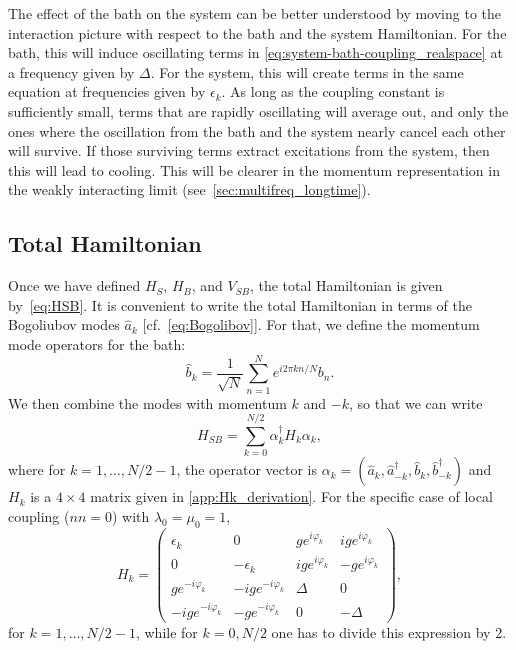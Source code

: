 \documentclass[aps,prx,twocolumn,superscriptaddress,nofootinbib,nolongbibliography,nobalancelastpage,10pt,floatfix]{revtex4-2}
\begin{document}
The effect of the bath on the system can be better understood by moving to the interaction picture with respect to the bath and the system Hamiltonian. For the bath, this will induce oscillating terms in \cref{eq:system-bath-coupling_realspace}
at a frequency given by $\Delta$. For the system, this will create terms in the same equation at frequencies given by $\epsilon_k$. As long as the coupling constant is sufficiently small, terms that are rapidly oscillating will average out, and only the ones where the oscillation from the bath and the system nearly cancel each other will survive. If those surviving terms extract excitations from the system, then this will lead to cooling. This will be clearer in the momentum representation in the weakly interacting limit (see~\cref{sec:multifreq_longtime}).

\subsection{Total Hamiltonian}
\label{subsec:total_hamiltonian}

Once we have defined $H_S$, $H_B$, and $V_{SB}$, the total Hamiltonian is given by~\cref{eq:HSB}. It is convenient to write the total Hamiltonian in terms of the Bogoliubov modes $\hat{a}_k$ [cf.~\cref{eq:Bogolibov}]. For that, we define the momentum mode operators for the bath:
\begin{equation}
    \hat b_k = \frac{1}{\sqrt{N}}\sum_{n=1}^N e^{i 2\pi k n/N} b_n.
\end{equation}
We then combine the modes with momentum $k$ and $-k$, so that we can write
\begin{equation}
    H_{SB} = \sum_{k=0}^{N/2} \alpha_k^\dagger H_{k} \alpha_k,
    \label{eq:HSB:Momentum}
\end{equation}
where for $k=1, \ldots, N/2-1$, the operator vector is $\alpha_k=(\hat{a}_{k},\hat{a}_{-k}^\dagger,\hat b_{k},\hat b_{-k}^\dagger)$ and $H_{k}$ is a $4\times 4$ matrix given in \cref{app:Hk_derivation}.
For the specific case of local coupling ($nn=0$) with $\lambda_0=\mu_0=1$,
\begin{equation}
    {H}_{k} =
    \begin{pmatrix}
        \epsilon_k         &0                   &ge^{i\varphi_k}   &ige^{i\varphi_k}\\
        0                  &-\epsilon_k         &ig e^{i\varphi_k} &-ge^{i\varphi_k}\\
        ge^{-i\varphi_k}   &-i ge^{-i\varphi_k} &\Delta            &0\\
        -ige^{-i\varphi_k} &-ge^{-i\varphi_k}   &0                 &-\Delta
    \end{pmatrix},
    \label{eq:H_bogoliubov}
\end{equation}
for $k=1, \ldots, N/2-1$, while for $k=0,N/2$ one has to divide this expression by 2.
\end{document}
